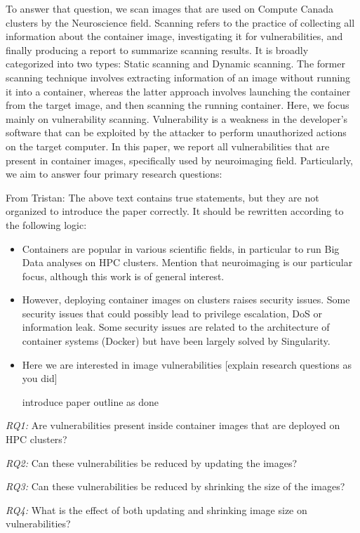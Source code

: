 \documentclass[a4paper,num-refs]{oup-contemporary}
\newcommand{\tristan}[1]{\color{blue}From Tristan: #1\color{black}}
\begin{document}
To answer that question, we scan images that are used on Compute
Canada clusters by the Neuroscience field. Scanning refers to the practice of
collecting all information about the container image, investigating it
for vulnerabilities, and finally producing a
report to summarize scanning results. It is broadly categorized into
two types: Static scanning and Dynamic scanning. The former scanning technique
involves extracting information of an image without running it into a container,
whereas the latter approach involves launching the container from the target image, and
then scanning the running container.
Here, we focus mainly on vulnerability scanning.
Vulnerability is a weakness in the developer's software that can be exploited
by the attacker to perform unauthorized actions on the target computer.
In this paper, we report all vulnerabilities that are present in
container images, specifically used by neuroimaging field. Particularly,
we aim to answer four primary research questions:

\tristan{The above text contains true statements, but they are not organized 
to introduce the paper correctly. It should be rewritten according to the following logic:
\begin{itemize}
	\item Containers are popular in various scientific fields, in particular to run Big Data analyses on HPC clusters. Mention that neuroimaging is our particular focus, although this work is of general interest.
	\item However, deploying container images on clusters raises security issues. Some security issues that could possibly lead to privilege escalation, DoS or information leak. Some
	security issues are related to the architecture of container systems (Docker) but have been largely solved by Singularity.
	\item Here we are interested in image vulnerabilities [explain research questions as you did]
	\item [introduce paper outline as done]
\end{itemize}}

\textit{RQ1:} Are vulnerabilities present inside container images that are
deployed on HPC clusters?

\textit{RQ2:} Can these vulnerabilities be reduced by updating the images?

\textit{RQ3:} Can these vulnerabilities be reduced by shrinking the size of the images?

\textit{RQ4:} What is the effect of both updating
and shrinking image size on vulnerabilities?
\end{document}
